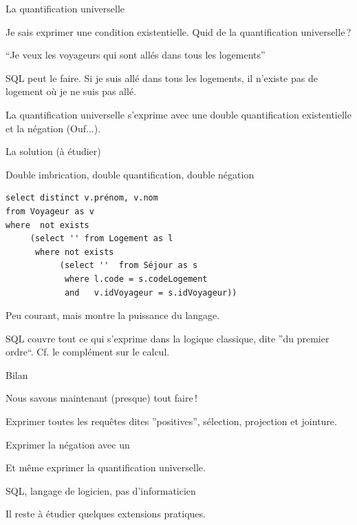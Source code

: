 \begin{frame}[fragile]{La quantification universelle}

Je sais exprimer une condition existentielle. Quid de la
quantification \alert{universelle}\,?

\vfill

``Je veux les voyageurs qui sont allés dans \alert{tous} les logements'' 

\vfill

\alert{SQL peut le faire}. Si je suis allé dans tous les logements,
\alert{il n'existe pas} de logement où \alert{je ne suis pas} allé.

\vfill

La quantification universelle s'exprime avec une double
quantification existentielle et la négation (Ouf...).
\end{frame}

\begin{frame}[fragile]{La solution (à étudier)}

Double imbrication, double quantification, double négation

\vfill

\begin{verbatim}
select distinct v.prénom, v.nom
from Voyageur as v
where  not exists 
     (select '' from Logement as l
      where not exists 
           (select ''  from Séjour as s
            where l.code = s.codeLogement
            and   v.idVoyageur = s.idVoyageur))
\end{verbatim}

\vfill

Peu courant, mais montre la puissance du langage. 

\vfill

SQL couvre tout ce qui s'exprime dans la logique classique,
dite ''du premier ordre``. Cf. le complément sur le calcul.

\end{frame}

\begin{frame}{Bilan}

Nous savons maintenant (presque) tout faire\,!
\vfill

\begin{redbullet}
 \item Exprimer toutes les requêtes dites ''positives'', sélection, projection
     et jointure.
  \item Exprimer la négation avec un 
  \item Et même exprimer la quantification universelle.
\end{redbullet}

\vfill

SQL, langage de logicien, pas d'informaticien

\vfill

Il reste à étudier quelques extensions pratiques.
\end{frame}


